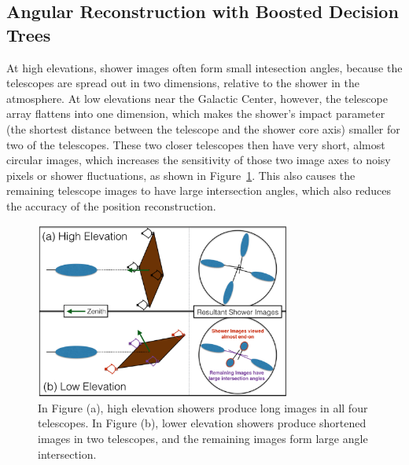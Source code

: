   \subsection{Angular Reconstruction with Boosted Decision Trees}\label{subsec:disp}
    At high elevations, shower images often form small intesection angles, because the telescopes are spread out in two dimensions, relative to the shower in the atmosphere.
    At low elevations near the Galactic Center, however, the telescope array flattens into one dimension, which makes the shower's impact parameter (the shortest distance between the telescope and the shower core axis) smaller for two of the telescopes.
    These two closer telescopes then have very short, almost circular images, which increases the sensitivity of those two image axes to noisy pixels or shower fluctuations, as shown in Figure~\ref{fig:showerhighlowelev}.
    This also causes the remaining telescope images to have large intersection angles, which also reduces the accuracy of the position reconstruction.

    \begin{figure}[!t]
      \centering
      \includegraphics[width=0.75\textwidth]{images/high_elevation_vs_low_shower_images_cropped.eps}
      \caption[Shower Images at High and Low Elevations]{
        In Figure (a), high elevation showers produce long images in all four telescopes.
        In Figure (b), lower elevation showers produce shortened images in two telescopes, and the remaining images form large angle intersection.
      }
      \label{fig:showerhighlowelev}
    \end{figure}

